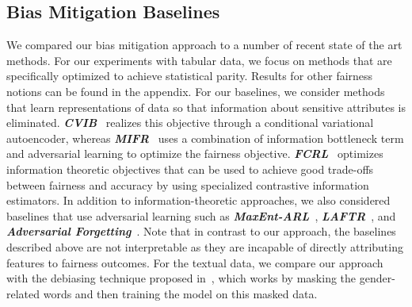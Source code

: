 \subsection{Bias Mitigation Baselines} 
\label{sec:baselines}
We compared our bias mitigation approach to a number of recent state of the art methods. For our experiments with tabular data, we focus on methods that are specifically optimized to achieve statistical parity. Results for other fairness notions can be found in the appendix. For our baselines, we consider methods that learn representations of data so that information about sensitive attributes is eliminated.
\textit{\textbf{CVIB}}~\cite{NEURIPS2018_415185ea} realizes this objective through a conditional variational autoencoder, whereas \textit{\textbf{MIFR}}~\cite{pmlr-v89-song19a} uses a combination of information bottleneck term and adversarial learning to optimize the fairness objective. 
\textit{\textbf{FCRL}}~\cite{gupta2021controllable} optimizes information theoretic objectives that can be used to achieve good trade-offs between fairness and accuracy by using specialized contrastive information estimators. 
In addition to information-theoretic approaches, we also considered baselines that use adversarial learning such as \textit{\textbf{MaxEnt-ARL}}~\cite{roy2019mitigating}, \textit{\textbf{LAFTR}}~\cite{pmlr-v80-madras18a}, and \textit{\textbf{Adversarial Forgetting}}~\cite{advforg}. Note that in contrast to our approach, the baselines described above are not interpretable as they  are incapable of directly attributing features to fairness outcomes. For the textual data, we compare our approach with the debiasing technique proposed in~\citet{de2019bias}, which works by masking the gender-related words and then training the model on this masked data. 




